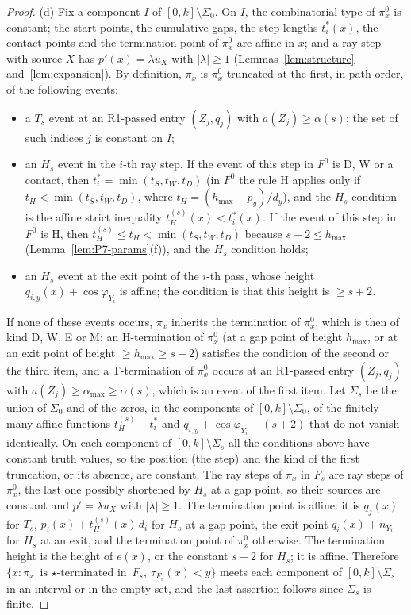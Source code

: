 \documentclass[11pt]{amsart}
\newcommand{\amax}{\alpha_{\max}}
\newcommand{\hmax}{h_{\max}}
\newcommand{\Fz}{F^{0}}
\newcommand{\Fs}{F_{s}}
\theoremstyle{definition}
\theoremstyle{remark}
\numberwithin{equation}{section}
\begin{document}
\begin{proof}
(d) Fix a component $I$ of $[0,k]\setminus\Sigma_0$. On $I$, the combinatorial type of $\pi^0_x$ is constant; the start points, the cumulative gaps, the step lengths $t^*_i(x)$, the contact points and the termination point of $\pi^0_x$ are affine in $x$; and a ray step with source $X$ has $p'(x)=\lambda u_X$ with $|\lambda|\ge1$ (Lemmas~\ref{lem:structure} and~\ref{lem:expansion}). By definition, $\pi_x$ is $\pi^0_x$ truncated at the first, in path order, of the following events:
\begin{itemize}
\item a $T_s$ event at an R1-passed entry $(Z_j,q_j)$ with $a(Z_j)\ge\alpha(s)$; the set of such indices $j$ is constant on $I$;
\item an $H_s$ event in the $i$-th ray step. If the event of this step in $\Fz$ is D, W or a contact, then $t^*_i=\min(t_S,t_W,t_D)$ (in $\Fz$ the rule H applies only if $t_H<\min(t_S,t_W,t_D)$, where $t_H=(\hmax-p_y)/d_y$), and the $H_s$ condition is the affine strict inequality $t_H^{(s)}(x)<t^*_i(x)$. If the event of this step in $\Fz$ is H, then $t_H^{(s)}\le t_H<\min(t_S,t_W,t_D)$ because $s+2\le\hmax$ (Lemma~\ref{lem:P7-params}(f)), and the $H_s$ condition holds;
\item an $H_s$ event at the exit point of the $i$-th pass, whose height $q_{i,y}(x)+\cos\varphi_{Y_i}$ is affine; the condition is that this height is $\ge s+2$.
\end{itemize}
If none of these events occurs, $\pi_x$ inherits the termination of $\pi^0_x$, which is then of kind D, W, E or M: an H-termination of $\pi^0_x$ (at a gap point of height $\hmax$, or at an exit point of height $\ge\hmax\ge s+2$) satisfies the condition of the second or the third item, and a T-termination of $\pi^0_x$ occurs at an R1-passed entry $(Z_j,q_j)$ with $a(Z_j)\ge\amax\ge\alpha(s)$, which is an event of the first item. Let $\Sigma_s$ be the union of $\Sigma_0$ and of the zeros, in the components of $[0,k]\setminus\Sigma_0$, of the finitely many affine functions $t_H^{(s)}-t^*_i$ and $q_{i,y}+\cos\varphi_{Y_i}-(s+2)$ that do not vanish identically. On each component of $[0,k]\setminus\Sigma_s$ all the conditions above have constant truth values, so the position (the step) and the kind of the first truncation, or its absence, are constant. The ray steps of $\pi_x$ in $\Fs$ are ray steps of $\pi^0_x$, the last one possibly shortened by $H_s$ at a gap point, so their sources are constant and $p'=\lambda u_X$ with $|\lambda|\ge1$. The termination point is affine: it is $q_j(x)$ for $T_s$, $p_i(x)+t_H^{(s)}(x)\,d_i$ for $H_s$ at a gap point, the exit point $q_i(x)+n_{Y_i}$ for $H_s$ at an exit, and the termination point of $\pi^0_x$ otherwise. The termination height is the height of $e(x)$, or the constant $s+2$ for $H_s$; it is affine. Therefore $\{x:\pi_x\text{ is $\star$-terminated in }\Fs,\ \tau_{\Fs}(x)<y\}$ meets each component of $[0,k]\setminus\Sigma_s$ in an interval or in the empty set, and the last assertion follows since $\Sigma_s$ is finite.
\end{proof}
\end{document}
